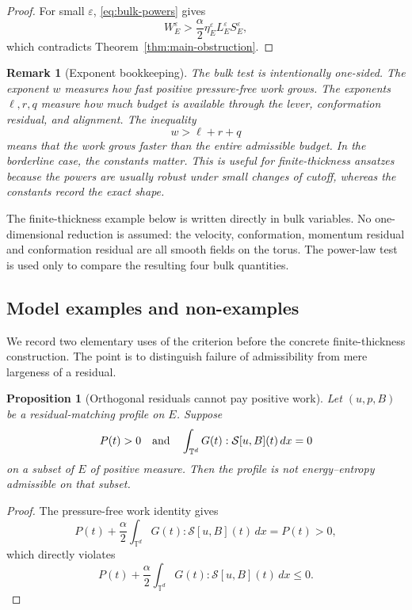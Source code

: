 \documentclass[11pt]{article}
\numberwithin{equation}{section}
\newtheorem{proposition}[theorem]{Proposition}
\newtheorem{remark}[theorem]{Remark}
\newcommand{\T}{\mathbb T}
\begin{document}
\begin{proof}
For small \(\varepsilon\), \eqref{eq:bulk-powers} gives
\[
  W_E^\varepsilon>
  \frac{\alpha}{2}\eta_E^\varepsilon L_E^\varepsilon S_E^\varepsilon,
\]
which contradicts Theorem~\ref{thm:main-obstruction}.
\end{proof}

\begin{remark}[Exponent bookkeeping]
The bulk test is intentionally one-sided.  The exponent \(w\) measures how fast
positive pressure-free work grows.  The exponents \(\ell,r,q\) measure how much
budget is available through the lever, conformation residual, and alignment.
The inequality
\[
  w>\ell+r+q
\]
means that the work grows faster than the entire admissible budget.  In the
borderline case, the constants matter.  This is useful for finite-thickness
ansatzes because the powers are usually robust under small changes of cutoff,
whereas the constants record the exact shape.
\end{remark}


The finite-thickness example below is written directly in bulk variables.  No
one-dimensional reduction is assumed: the velocity, conformation, momentum
residual and conformation residual are all smooth fields on the torus.  The
power-law test is used only to compare the resulting four bulk quantities.

\subsection{Model examples and non-examples}
\label{sec:examples}

We record two elementary uses of the criterion before the concrete
finite-thickness construction.  The point is to distinguish failure of
admissibility from mere largeness of a residual.

\begin{proposition}[Orthogonal residuals cannot pay positive work]
\label{prop:orthogonal-nonexample}
Let \((u,p,B)\) be a residual-matching profile on \(E\).  Suppose
\[
  P(t)>0
  \quad\hbox{and}\quad
  \int_{\T^d}G(t):\mathcal S[u,B](t)\,dx=0
\]
on a subset of \(E\) of positive measure.  Then the profile is not
energy--entropy admissible on that subset.
\end{proposition}

\begin{proof}
The pressure-free work identity gives
\[
  P(t)+\frac{\alpha}{2}\int_{\T^d}G(t):\mathcal S[u,B](t)\,dx=P(t)>0,
\]
which directly violates
\[
  P(t)+\frac{\alpha}{2}\int_{\T^d}G(t):\mathcal S[u,B](t)\,dx\le0 .
\]
\end{proof}
\end{document}
